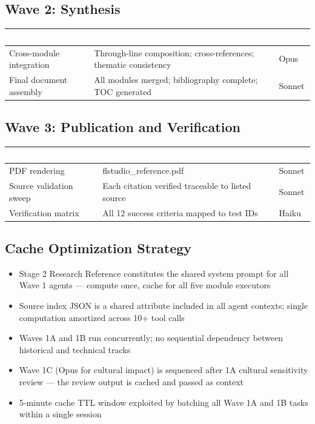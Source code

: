 \documentclass[11pt,letterpaper]{article}
\newcommand{\tableheader}[1]{\textbf{\sffamily\textcolor{white}{#1}}}
\begin{document}
\subsection{Wave 2: Synthesis}

\begin{center}
\begin{tabularx}{\textwidth}{L{3.5cm}XC{2cm}}
\toprule
{}
\tableheader{Task} & \tableheader{Output} & \tableheader{Model} \\
\midrule
Cross-module integration & Through-line composition; cross-references; thematic consistency & Opus \\
Final document assembly & All modules merged; bibliography complete; TOC generated & Sonnet \\
\bottomrule
\end{tabularx}
\end{center}

\subsection{Wave 3: Publication and Verification}

\begin{center}
\begin{tabularx}{\textwidth}{L{3.5cm}XC{2cm}}
\toprule
{}
\tableheader{Task} & \tableheader{Output} & \tableheader{Model} \\
\midrule
PDF rendering & flstudio\_reference.pdf & Sonnet \\
Source validation sweep & Each citation verified traceable to listed source & Sonnet \\
Verification matrix & All 12 success criteria mapped to test IDs & Haiku \\
\bottomrule
\end{tabularx}
\end{center}

\subsection{Cache Optimization Strategy}

\begin{itemize}[noitemsep]
  \item Stage 2 Research Reference constitutes the shared system prompt for all Wave 1 agents --- compute once, cache for all five module executors
  \item Source index JSON is a shared attribute included in all agent contexts; single computation amortized across 10+ tool calls
  \item Waves 1A and 1B run concurrently; no sequential dependency between historical and technical tracks
  \item Wave 1C (Opus for cultural impact) is sequenced after 1A cultural sensitivity review --- the review output is cached and passed as context
  \item 5-minute cache TTL window exploited by batching all Wave 1A and 1B tasks within a single session
\end{itemize}
\end{document}
